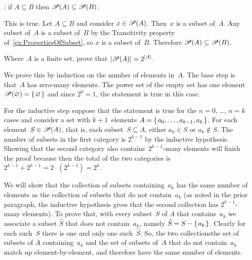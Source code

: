 \documentclass{ibl}  %
\begin{document}
\begin{problem}
\end{problem}

\begin{problem} \pord:
if $A\subseteq B$ then $\mathscr{P}(A)\subseteq\mathscr{P}(B)$.  
\begin{answer}
This is true.
Let $A\subseteq B$ and consider $x\in\mathscr{P}(A)$.
Then~$x$ is a subset of~$A$.
Any subset of~$A$ is a subset of~$B$ by 
the Transitivity property of~\ref{ex:PropertiesOfSubset},
so $x$ is a subset of~$B$.
Therefore $\mathscr{P}(A)\subseteq\mathscr{P}(B)$.
\end{answer}
\end{problem}

\begin{problem}
Where~$A$ is a finite set, prove that $|\mathscr{P}(A)|=2^{|A|}$.    
\begin{answer}
We prove this by induction on the number of elements in~$A$.
The base step is that~$A$ has zero-many elements.
The power set of the empty set has
one element $\mathscr{P}(\varnothing)=\mbox{$\{\hspace{0.1em}\varnothing\hspace{0.1em}\}$}$ and
since $2^0=1$, the statement is true in this case. 

For the inductive step suppose that the statement is true for the 
$n=0$, \ldots, $n=k$ cases and consider a set
with $k+1$~elements
$A=\mbox{$\{\hspace{0.1em}a_0, \ldots, a_{k-1},a_k\hspace{0.1em}\}$}$.
For each element~$S\in\mathscr{P}(A)$, that is, each subset~$S\subseteq A$,
either $a_k\in S$ or $a_k\notin S$.
The number of subsets in the first category is $2^{k-1}$ by the inductive
hypothesis.
Showing that 
the second category also contains~$2^{k-1}$-many elements will finish the proof
because then
the total of the two categories is 
$2^{k-1}+2^{k-1}=2\cdot(2^{k-1})=2^k$.

We will show that the collection of subsets containing~$a_k$
has the same number of elements as the collection of subsets that do not
contain~$a_k$
(as noted in the prior paragraph, the inductive hypothesis gives that
the second collection has $2^{k-1}$-many elements).
To prove that, with every subset~$S$ of $A$ that contains~$a_k$ we associate
a subset $\hat{S}$ that does not contain~$a_k$,
namely $\hat{S}=S-\mbox{$\{\hspace{0.1em}a_k\hspace{0.1em}\}$}$.
Clearly for each such~$S$ there is one and only one such~$\hat{S}$.
So, the two collections\Dash the set of subsets of $A$ containing~$a_k$
and the set of subsets of~$A$ that do not contain~$a_k$\Dash match
up element-by-element, and therefore have the same number of elements.
\end{answer}
\end{problem}
\end{document}
